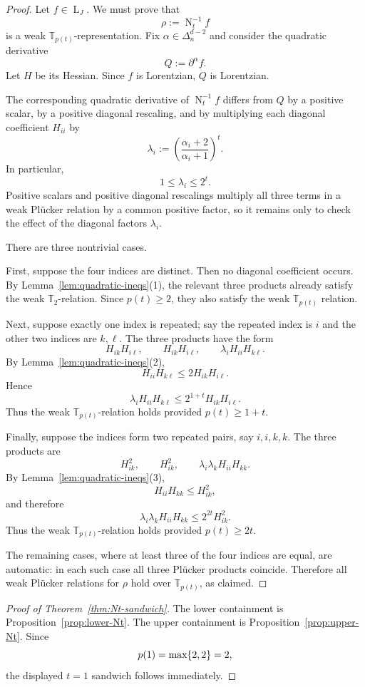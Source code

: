 \documentclass[12pt]{amsart}
\theoremstyle{definition}
\newcommand{\1}{\mathbf{1}}
\DeclareMathOperator{\upN}{N}   %
\DeclareMathOperator{\upL}{L}   %
\newcommand\T{{\mathbb T}}
\renewcommand\max{\textup{max}}
\begin{document}
\begin{proof}
Let $f\in\upL_J$.  We must prove that
\[
\rho:=\upN_t^{-1}f
\]
is a weak $\T_{p(t)}$-representation.  Fix
$\alpha\in\Delta_n^{d-2}$ and consider the quadratic derivative
\[
Q:=\partial^\alpha f.
\]
Let $H$ be its Hessian.  Since $f$ is Lorentzian, $Q$ is Lorentzian.

The corresponding quadratic derivative of $\upN_t^{-1}f$ differs from $Q$ by a
positive scalar, by a positive diagonal rescaling, and by multiplying each
diagonal coefficient $H_{ii}$ by
\[
\lambda_i
:=
\left(\frac{\alpha_i+2}{\alpha_i+1}\right)^t.
\]
In particular,
\[
1\le \lambda_i\le 2^t.
\]
Positive scalars and positive diagonal rescalings multiply all three terms in a
weak Pl\"ucker relation by a common positive factor, so it remains only to check
the effect of the diagonal factors $\lambda_i$.

There are three nontrivial cases.

First, suppose the four indices are distinct.  Then no diagonal coefficient
occurs.  By Lemma~\ref{lem:quadratic-ineqs}(1), the relevant three products
already satisfy the weak $\T_2$-relation.  Since $p(t)\ge 2$, they also satisfy
the weak $\T_{p(t)}$ relation.

Next, suppose exactly one index is repeated; say the repeated index is $i$ and
the other two indices are $k,\ell$.  The three products have the form
\[
H_{ik}H_{i\ell},
\qquad
H_{ik}H_{i\ell},
\qquad
\lambda_i H_{ii}H_{k\ell}.
\]
By Lemma~\ref{lem:quadratic-ineqs}(2),
\[
H_{ii}H_{k\ell}\le 2H_{ik}H_{i\ell}.
\]
Hence
\[
\lambda_i H_{ii}H_{k\ell}
\le 2^{1+t}H_{ik}H_{i\ell}.
\]
Thus the weak $\T_{p(t)}$-relation holds provided
$p(t)\ge 1+t$.

Finally, suppose the indices form two repeated pairs, say $i,i,k,k$.  The three
products are
\[
H_{ik}^2,
\qquad
H_{ik}^2,
\qquad
\lambda_i\lambda_k H_{ii}H_{kk}.
\]
By Lemma~\ref{lem:quadratic-ineqs}(3),
\[
H_{ii}H_{kk}\le H_{ik}^2,
\]
and therefore
\[
\lambda_i\lambda_kH_{ii}H_{kk}
\le 2^{2t}H_{ik}^2.
\]
Thus the weak $\T_{p(t)}$-relation holds provided
$p(t)\ge 2t$.

The remaining cases, where at least three of the four indices are equal, are
automatic: in each such case all three Pl\"ucker products coincide.  Therefore all
weak Pl\"ucker relations for $\rho$ hold over $\T_{p(t)}$, as claimed.
\end{proof}

\begin{proof}[Proof of Theorem~\ref{thm:Nt-sandwich}]
The lower containment is Proposition~\ref{prop:lower-Nt}.  The upper containment
is Proposition~\ref{prop:upper-Nt}.  Since
\[
p(1)=\max\{2,2\}=2,
\]
the displayed $t=1$ sandwich follows immediately.
\end{proof}
\end{document}
